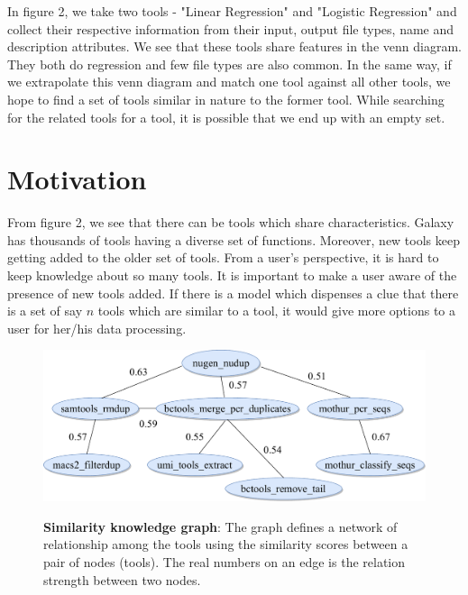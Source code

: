 In figure 2, we take two tools - "Linear Regression" and "Logistic Regression" and collect their respective information from their input, output file types, name and description attributes. We see that these tools share features in the venn diagram. They both do regression and few file types are also common. In the same way, if we extrapolate this venn diagram and match one tool against all other tools, we hope to find a set of tools similar in nature to the former tool. While searching for the related tools for a tool, it is possible that we end up with an empty set.

\section{Motivation}
From figure 2, we see that there can be tools which share characteristics. Galaxy has thousands of tools having a diverse set of functions. Moreover, new tools keep getting added to the older set of tools. From a user's perspective, it is hard to keep knowledge about so many tools. It is important to make a user aware of the presence of new tools added. If there is a model which dispenses a clue that there is a set of say $n$ tools which are similar to a tool, it would give more options to a user for her/his data processing. 

\begin{figure}[h]
\begin{centering}
    {\includegraphics[scale=0.6]{figures/tools_sim_know_graph.pdf}}
    \caption[Similarity knowledge graph]{\textbf{Similarity knowledge graph}: The graph defines a network of relationship among the tools using the similarity scores between a pair of nodes (tools). The real numbers on an edge is the relation strength between two nodes.}
\end{centering}
\end{figure}

